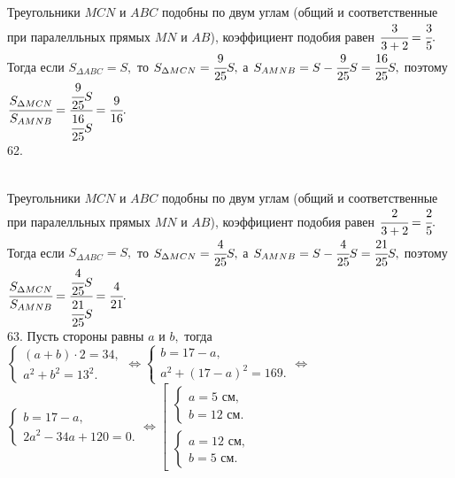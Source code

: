 \documentclass[12pt]{article}
\begin{document}
Треугольники $MCN$ и $ABC$ подобны по двум углам (общий и соответственные при паралелльных прямых $MN$ и $AB$), коэффициент подобия равен $\cfrac{3}{3+2}=\cfrac{3}{5}.$ Тогда если $S_{\Delta ABC}=S,$ то $S_{\Delta MCN}=\cfrac{9}{25}S,$ а $S_{AMNB}=S-\cfrac{9}{25}S=\cfrac{16}{25}S,$ поэтому $\cfrac{S_{\Delta MCN}}{S_{AMNB}}=\cfrac{\cfrac{9}{25}S}{\cfrac{16}{25}S}=\cfrac{9}{16}.$\\
62. \begin{figure}[ht!]
\end{figure}\\
Треугольники $MCN$ и $ABC$ подобны по двум углам (общий и соответственные при паралелльных прямых $MN$ и $AB$), коэффициент подобия равен $\cfrac{2}{3+2}=\cfrac{2}{5}.$ Тогда если $S_{\Delta ABC}=S,$ то $S_{\Delta MCN}=\cfrac{4}{25}S,$ а $S_{AMNB}=S-\cfrac{4}{25}S=\cfrac{21}{25}S,$ поэтому $\cfrac{S_{\Delta MCN}}{S_{AMNB}}=\cfrac{\cfrac{4}{25}S}{\cfrac{21}{25}S}=\cfrac{4}{21}.$\\
63. Пусть стороны равны $a$ и $b,$ тогда $\begin{cases}(a+b)\cdot2=34,\\ a^2+b^2=13^2.\end{cases}\Leftrightarrow
\begin{cases}b=17-a,\\ a^2+(17-a)^2=169.\end{cases}\Leftrightarrow$\\$
\begin{cases}b=17-a,\\ 2a^2-34a+120=0.\end{cases}\Leftrightarrow
\left[\begin{array}{l}\begin{cases}a=5\text{ см},\\ b=12\text{ см}.\end{cases}\\ \begin{cases}a=12\text{ см},\\ b=5\text{ см}.\end{cases}\end{array}\right.$\\
\end{document}
